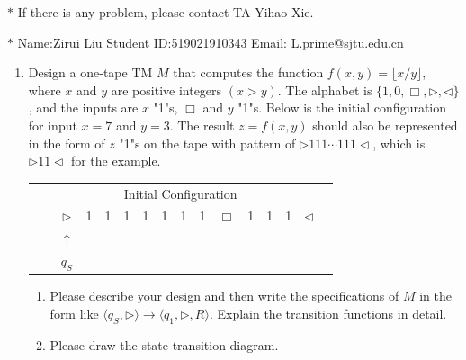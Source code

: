 \documentclass[12pt,a4paper]{article}
\theoremstyle{definition}
\begin{document}
\noindent

\noindent{}
\begin{center}
\footnotesize{\color{red}$*$ If there is any problem, please contact TA Yihao Xie. }

\footnotesize{\color{blue}$*$ Name:Zirui Liu  \quad Student ID:519021910343 \quad Email: L.prime@sjtu.edu.cn}
\end{center}

\begin{enumerate}
    \item Design a one-tape TM $M$ that computes the function $f(x, y) = \lfloor x/y \rfloor$, where $x$ and $y$ are positive integers $(x > y)$. The alphabet is $\{1, 0, \Box, \triangleright, \triangleleft\}$, and the inputs are $x$ "1"s, $\Box$ and $y$ "1"s. Below is the initial configuration for input $x=7$ and $y=3$. The result $z=f(x,y)$ should also be represented in the form of $z$ "1"s on the tape with pattern of $\rhd 111\cdots 111\lhd$, which is $\rhd 11\lhd$ for the example.
    
	\begin{center}
		\begin{tabular}{ll|c|c|c|c|c|c|c|c|c|c|c|c|c|c}
			& \multicolumn{14}{c}{Initial Configuration}\\[5pt]
			\cline{2-16}
			& & $\triangleright$ &  1  & 1 & 1 & 1 & 1 & 1 & 1 & $\Box$ & 1 & 1 & 1 & $ \triangleleft$ & \\
			\cline{2-16}
			\multicolumn{2}{c}{} & \multicolumn{1}{c}{$\uparrow$} & \multicolumn{11}{c}{}\\[-4px]
			\multicolumn{2}{c}{} & \multicolumn{1}{c}{$q_S$} & \multicolumn{11}{c}{}	
		\end{tabular}
	\end{center}

    \begin{enumerate}
	\item
	Please describe your design and then write the specifications of $M$ in the form like $\langle q_S, \triangleright \rangle \rightarrow \langle q_1, \triangleright,  R\rangle$. Explain the transition functions in detail.
	
	\item
	Please draw the state transition diagram.
	

\end{enumerate}
\end{enumerate}
\end{document}
